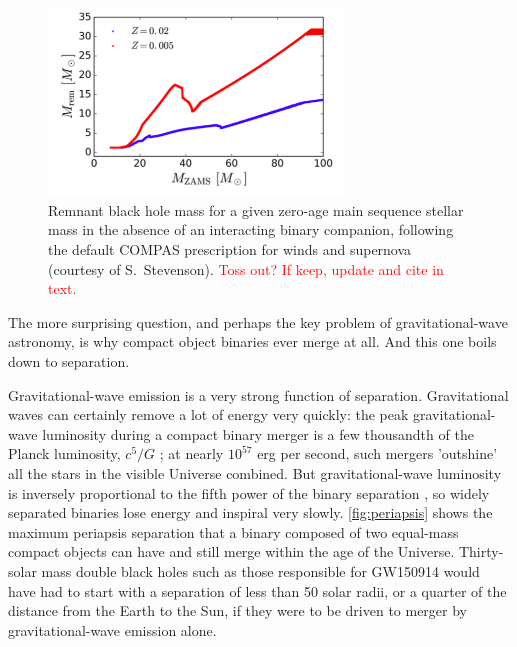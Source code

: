\documentclass[iop,onecolumn]{revtex4}
\newcommand{\todo}[1]{\textcolor{red}{#1}}
\begin{document}
\begin{figure}
	\centering
	\includegraphics[width=0.7\textwidth]{BHremnant.png}
	\caption{\label{fig:BHremnant} Remnant black hole mass for a given zero-age main sequence stellar mass in the absence of an interacting binary companion, following the default COMPAS prescription for winds and supernova \citep{Stevenson:2017} (courtesy of S.~Stevenson).  \todo{Toss out? If keep, update and cite in text.}}
\end{figure}

The more surprising question, and perhaps the key problem of gravitational-wave astronomy, is why compact object binaries ever merge at all.  And this one boils down to separation.  

Gravitational-wave emission is a very strong function of separation.  Gravitational waves can certainly remove a lot of energy very quickly: the peak gravitational-wave luminosity during a compact binary merger is a few thousandth of the Planck luminosity, $c^5/G$ \citep[e.g.,][]{Cardoso:2018}; at nearly $10^{57}$ erg per second, such mergers 'outshine' all the stars in the visible Universe combined.  But gravitational-wave luminosity is inversely proportional to the fifth power of the binary separation \citep{Peters:1964}, so widely separated binaries lose energy and inspiral very slowly.  \autoref{fig:periapsis} shows the maximum periapsis separation that a binary composed of two equal-mass compact objects can have and still merge within the age of the Universe.  Thirty-solar mass double black holes such as those responsible for GW150914 would have had to start with a separation of less than 50 solar radii, or a quarter of the distance from the Earth to the Sun, if they were to be driven to merger by gravitational-wave emission alone.
\end{document}
